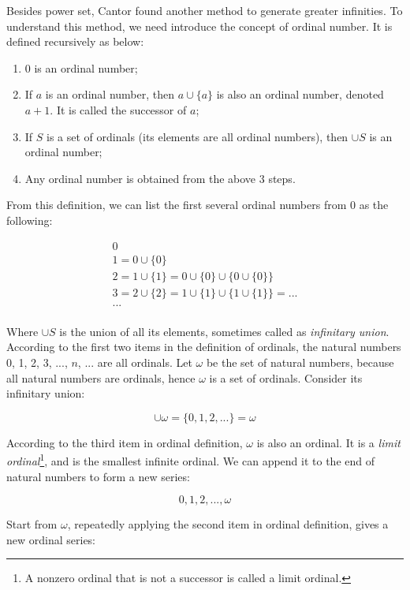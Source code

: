 \documentclass{article}
\begin{document}
Besides power set, Cantor found another method to generate greater infinities. To understand this method, we need introduce the concept of ordinal number. It is defined recursively as below:

\begin{enumerate}
\item 0 is an ordinal number;
\item If $a$ is an ordinal number, then $a \cup \{a\}$ is also an ordinal number, denoted $a + 1$. It is called the successor of $a$;
\item If $S$ is a set of ordinals (its elements are all ordinal numbers), then $\cup S$ is an ordinal number;
\item Any ordinal number is obtained from the above 3 steps.
\end{enumerate}

From this definition, we can list the first several ordinal numbers from 0 as the following:

\[
\begin{array}{l}
0 \\
1 = 0 \cup \{0\} \\
2 = 1 \cup \{1\} = 0 \cup \{0\} \cup \{0 \cup \{0\}\} \\
3 = 2 \cup \{2\} = 1 \cup \{1\} \cup \{1 \cup \{1\}\} = ... \\
... \\
\end{array}
\]

Where $\cup S$ is the union of all its elements, sometimes called as {\em infinitary union}. According to the first two items in the definition of ordinals, the natural numbers 0, 1, 2, 3, ..., $n$, ... are all ordinals. Let $\omega$ be the set of natural numbers, because all natural numbers are ordinals, hence $\omega$ is a set of ordinals. Consider its infinitary union:

\[
\cup \omega = \{0, 1, 2, ...\} = \omega
\]

According to the third item in ordinal definition, $\omega$ is also an ordinal. It is a {\em limit ordinal}\footnote{A nonzero ordinal that is not a successor is called a limit ordinal.}, and is the smallest infinite ordinal. We can append it to the end of natural numbers to form a new series:

\[
0, 1, 2, ..., \omega
\]

Start from $\omega$, repeatedly applying the second item in ordinal definition, gives a new ordinal series:
\end{document}
